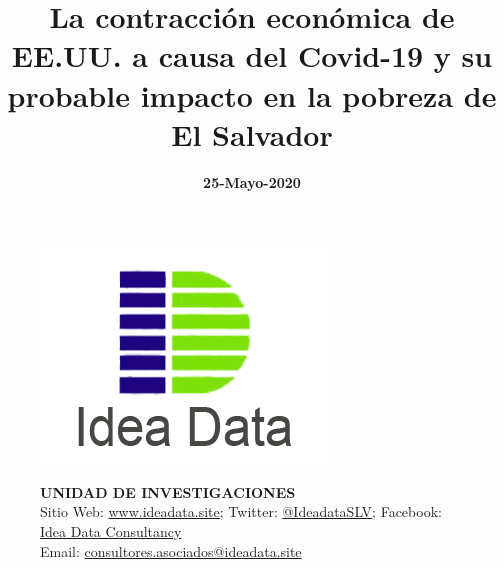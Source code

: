 


\setlength{\droptitle}{-3.5\baselineskip}

\title{{\Huge La contracción económica de EE.UU. a causa del Covid-19 y su probable impacto en la pobreza de El Salvador }}

\date{\textbf{25-Mayo-2020}}

\maketitle 




\begin{figure}[H]
	\centering
	\resizebox{3cm}{!} { 
		\includegraphics[width=1\linewidth]{Imagenes/Logo}
	}
	
	\centering
	{\bf UNIDAD DE INVESTIGACIONES}\\
	Sitio Web: \href{www.ideadata.site/home/}{www.ideadata.site}; Twitter: \href{https://twitter.com/Ideadata_SLV}{@IdeadataSLV}; Facebook: \href{https://www.facebook.com/Idea-Data-Consultancy-104132684512624/}{Idea Data Consultancy}\\
	Email: \href{mailto:consultores.asociados@ideadata.site}{consultores.asociados@ideadata.site}\\
	
\end{figure}

